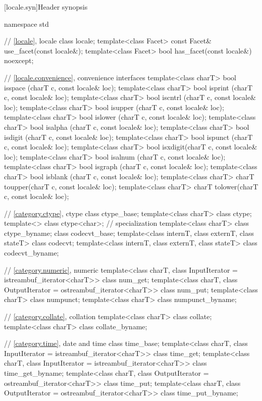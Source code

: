 [locale.syn]{Header  synopsis}

%
\begin{codeblock}
namespace std {
  // \ref{locale}, locale
  class locale;
  template<class Facet> const Facet& use_facet(const locale&);
  template<class Facet> bool         has_facet(const locale&) noexcept;

  // \ref{locale.convenience}, convenience interfaces
  template<class charT> bool isspace (charT c, const locale& loc);
  template<class charT> bool isprint (charT c, const locale& loc);
  template<class charT> bool iscntrl (charT c, const locale& loc);
  template<class charT> bool isupper (charT c, const locale& loc);
  template<class charT> bool islower (charT c, const locale& loc);
  template<class charT> bool isalpha (charT c, const locale& loc);
  template<class charT> bool isdigit (charT c, const locale& loc);
  template<class charT> bool ispunct (charT c, const locale& loc);
  template<class charT> bool isxdigit(charT c, const locale& loc);
  template<class charT> bool isalnum (charT c, const locale& loc);
  template<class charT> bool isgraph (charT c, const locale& loc);
  template<class charT> bool isblank (charT c, const locale& loc);
  template<class charT> charT toupper(charT c, const locale& loc);
  template<class charT> charT tolower(charT c, const locale& loc);

  // \ref{category.ctype}, ctype
  class ctype_base;
  template<class charT> class ctype;
  template<>            class ctype<char>;      // specialization
  template<class charT> class ctype_byname;
  class codecvt_base;
  template<class internT, class externT, class stateT> class codecvt;
  template<class internT, class externT, class stateT> class codecvt_byname;

  // \ref{category.numeric}, numeric
  template<class charT, class InputIterator = istreambuf_iterator<charT>>
    class num_get;
  template<class charT, class OutputIterator = ostreambuf_iterator<charT>>
    class num_put;
  template<class charT>
    class numpunct;
  template<class charT>
    class numpunct_byname;

  // \ref{category.collate}, collation
  template<class charT> class collate;
  template<class charT> class collate_byname;

  // \ref{category.time}, date and time
  class time_base;
  template<class charT, class InputIterator = istreambuf_iterator<charT>>
    class time_get;
  template<class charT, class InputIterator = istreambuf_iterator<charT>>
    class time_get_byname;
  template<class charT, class OutputIterator = ostreambuf_iterator<charT>>
    class time_put;
  template<class charT, class OutputIterator = ostreambuf_iterator<charT>>
    class time_put_byname;

}
\end{codeblock}
